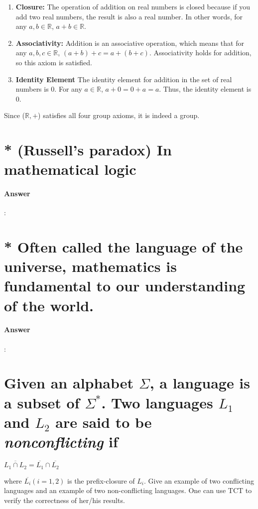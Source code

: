 \documentclass{article}
\begin{document}
\begin{enumerate}
  \item \textbf{Closure:} The operation of addition on real numbers is closed because if you add two real numbers, the result is also a real number. In other words, for any $a, b \in \mathbb{R}$, $a + b \in \mathbb{R}$.
  \item \textbf{Associativity:} Addition is an associative operation, which means that for any $a, b, c \in \mathbb{R}$, $(a + b) + c = a + (b + c)$. Associativity holds for addition, so this axiom is satisfied.
  \item \textbf{Identity Element} The identity element for addition in the set of real numbers is 0. For any $a \in \mathbb{R}$, $a + 0 = 0 + a = a$. Thus, the identity element is 0.
\end{enumerate}

Since ($\mathbb{R}, +$) satisfies all four group axioms, it is indeed a group.



\section{* (Russell’s paradox) In mathematical logic}

\paragraph{Answer}:

\section{* Often called the language of the universe, mathematics is fundamental to our understanding of the world.}

\paragraph{Answer}:

\section{Given an alphabet $\Sigma$, a language is a subset of $\Sigma^*$. Two languages $L_1$ and $L_2$ are said to be \textit{nonconflicting} if}

$\overline{L_1 \cap L_2} = \overline{L_1} \cap \overline{L_2} $

where $\overline{L_i} (i = 1, 2)$ is the prefix-closure of $L_i$. Give an example of two conflicting languages and an example of two non-conflicting languages. One can use TCT to verify the correctness of her/his results.
\end{document}
